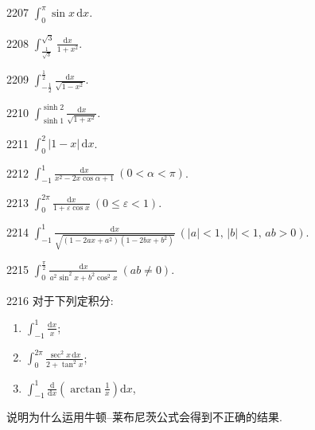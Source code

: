 \begin{prob}[S]{2207}
$\displaystyle\int_{0}^{\pi} \sin x\,\mathrm{d}x$.
\end{prob}

\begin{prob}[S]{2208}
$\displaystyle\int_{\frac{1}{\sqrt{3}}}^{\sqrt{3}} \frac{\mathrm{d}x}{1 + x^2}$.
\end{prob}

\begin{prob}[S]{2209}
$\displaystyle\int_{-\frac{1}{2}}^{\frac{1}{2}} \frac{\mathrm{d}x}{\sqrt{1 - x^2}}$.
\end{prob}

\begin{prob}[S]{2210}
$\displaystyle\int_{\sinh 1}^{\sinh 2} \frac{\mathrm{d}x}{\sqrt{1 + x^2}}$.
\end{prob}

\begin{prob}[S]{2211}
$\displaystyle\int_{0}^{2} |1 - x|\,\mathrm{d}x$.
\end{prob}

\begin{prob}[S]{2212}
$\displaystyle\int_{-1}^{1} \frac{\mathrm{d}x}{x^2 - 2x\cos\alpha + 1} \ (0 < \alpha < \pi)$.
\end{prob}

\begin{prob}[S]{2213}
$\displaystyle\int_{0}^{2\pi} \frac{\mathrm{d}x}{1 + \varepsilon\cos x} \ (0 \leqslant \varepsilon < 1)$.
\end{prob}

\begin{prob}[S]{2214}
$\displaystyle\int_{-1}^{1} \frac{\mathrm{d}x}{\sqrt{(1 - 2ax + a^2)(1 - 2bx + b^2)}} \ (|a| < 1, \, |b| < 1, \, ab > 0)$.
\end{prob}

\begin{prob}[S]{2215}
$\displaystyle\int_{0}^{\frac{\pi}{2}} \frac{\mathrm{d}x}{a^2 \sin^2 x + b^2 \cos^2 x} \ (ab \neq 0)$.
\end{prob}

\begin{prob}[L]{2216}
对于下列定积分:
\begin{enumerate}[label=(\alph*), itemsep=2pt, topsep=3pt]
  \item $\displaystyle\int_{-1}^{1} \frac{\mathrm{d}x}{x}$;
  \item $\displaystyle\int_{0}^{2\pi} \frac{\sec^2 x\,\mathrm{d}x}{2 + \tan^2 x}$;
  \item $\displaystyle\int_{-1}^{1} \frac{\mathrm{d}}{\mathrm{d}x}\left(\arctan\frac{1}{x}\right)\mathrm{d}x$,
\end{enumerate}
说明为什么运用牛顿--莱布尼茨公式会得到不正确的结果.
\end{prob}

